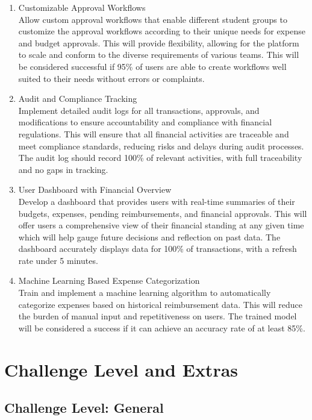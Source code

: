 \documentclass{article}
\begin{document}
\begin{enumerate}
    \item Customizable Approval Workflows \\
    Allow custom approval workflows that enable different student groups to customize the approval workflows according to their unique needs for expense and budget approvals. This will provide flexibility, allowing for the platform to scale and conform to the diverse requirements of various teams. This will be considered successful if 95\% of users are able to create workflows well suited to their needs without errors or complaints.
    \item Audit and Compliance Tracking \\
    Implement detailed audit logs for all transactions, approvals, and modifications to ensure accountability and compliance with financial regulations. This will ensure that all financial activities are traceable and meet compliance standards, reducing risks and delays during audit processes. The audit log should record 100\% of relevant activities, with full traceability and no gaps in tracking.
    \item User Dashboard with Financial Overview \\
    Develop a dashboard that provides users with real-time summaries of their budgets, expenses, pending reimbursements, and financial approvals. This will offer users a comprehensive view of their financial standing at any given time which will help gauge future decisions and reflection on past data. The dashboard accurately displays data for 100\% of transactions, with a refresh rate under 5 minutes.
    \item Machine Learning Based Expense Categorization \\
    Train and implement a machine learning algorithm to automatically categorize expenses based on historical reimbursement data. This will reduce the burden of manual input and repetitiveness on users. The trained model will be considered a success if it can achieve an accuracy rate of at least 85\%.
\end{enumerate}

\section{Challenge Level and Extras}
\subsection{Challenge Level: General}
\end{document}
